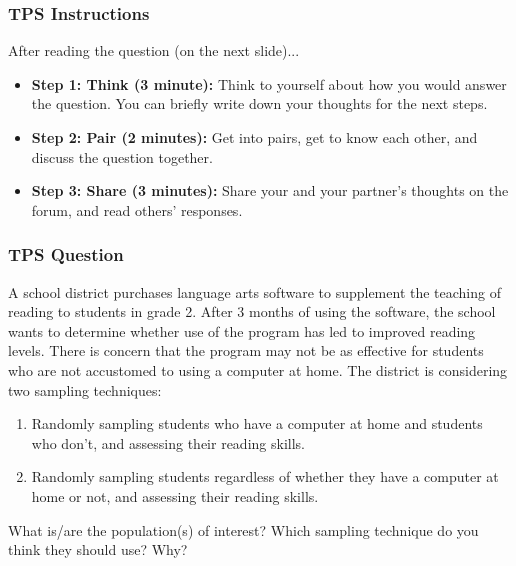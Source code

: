 \documentclass[slidestop,compress,mathserif]{beamer}
\begin{document}
\begin{frame}
	\frametitle{TPS Instructions}

	After reading the question (on the next slide)...

	\begin{itemize}
		\item \textbf{Step 1: Think (3 minute):} Think to yourself about how you would answer the question. You can briefly write down your thoughts for the next steps.
		\item \textbf{Step 2: Pair (2 minutes):} Get into pairs, get to know each other, and discuss the question together. 
		\item \textbf{Step 3: Share (3 minutes):} Share your and your partner's thoughts on the forum, and read others' responses.
	\end{itemize}
\end{frame}

\begin{frame}
	\frametitle{TPS Question}

	A school district purchases language arts software to supplement the teaching of reading to students in grade 2. 
	After 3 months of using the software, the school wants to determine whether use of the program has led to improved reading levels. 
	There is concern that the program may not be as effective for students who are not accustomed to using a computer at home. 
	The district is considering two sampling techniques:

	\begin{enumerate}
		\item Randomly sampling students who have a computer at home and students who don't, and assessing their reading skills. 
		\item Randomly sampling students regardless of whether they have a computer at home or not, and assessing their reading skills. 
	\end{enumerate}

	What is/are the population(s) of interest? Which sampling technique do you think they should use? Why?
\end{frame}

\end{document}
